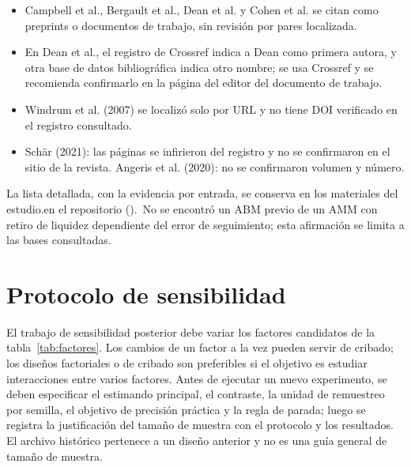 \begin{itemize}
  \item Campbell et al., Bergault et al., Dean et al. y Cohen et al. se citan como preprints o documentos de trabajo, sin revisión por pares localizada.
  \item En Dean et al., el registro de Crossref indica a Dean como primera autora, y otra base de datos bibliográfica indica otro nombre; se usa Crossref y se recomienda confirmarlo en la página del editor del documento de trabajo.
  \item Windrum et al. (2007) se localizó solo por URL y no tiene DOI verificado en el registro consultado.
  \item Schär (2021): las páginas se infirieron del registro y no se confirmaron en el sitio de la revista. Angeris et al. (2020): no se confirmaron volumen y número.
\end{itemize}

La lista detallada, con la evidencia por entrada, se conserva \ifdefined\blindreviewmode en los materiales del estudio.\else en el repositorio ().\fi\ No se encontró un ABM previo de un AMM con retiro de liquidez dependiente del error de seguimiento; esta afirmación se limita a las bases consultadas.

\section{Protocolo de sensibilidad}
\label{sec:sensibilidad}

El trabajo de sensibilidad posterior debe variar los factores candidatos de la tabla~\ref{tab:factores}. Los cambios de un factor a la vez pueden servir de cribado; los diseños factoriales o de cribado \cite{morris1991factorial,saltelli2010variance} son preferibles si el objetivo es estudiar interacciones entre varios factores. Antes de ejecutar un nuevo experimento, se deben especificar el estimando principal, el contraste, la unidad de remuestreo por semilla, el objetivo de precisión práctica y la regla de parada; luego se registra la justificación del tamaño de muestra con el protocolo y los resultados. El archivo histórico  pertenece a un diseño anterior y no es una guía general de tamaño de muestra.

